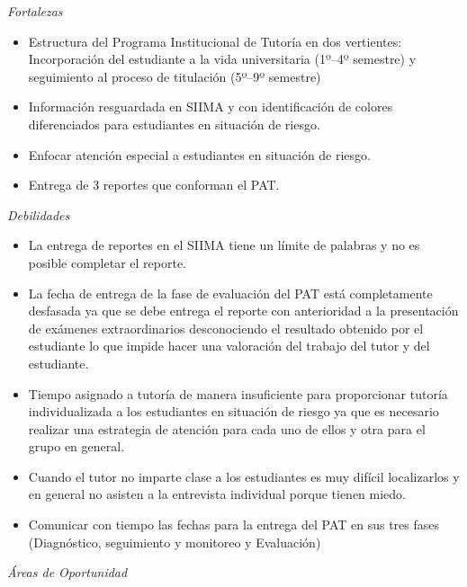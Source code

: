 \enlargethispage{1\baselineskip}
{\itshape Fortalezas}

\begin{itemize}
\item Estructura del Programa Institucional de Tutoría en dos vertientes:
Incorporación del estudiante a la vida universitaria (1º--4º semestre) y
seguimiento al proceso de titulación (5º--9º semestre)
\item Información resguardada en SIIMA y con identificación de colores
diferenciados para estudiantes en situación de riesgo.
\item Enfocar atención especial a estudiantes en situación de riesgo.
\item Entrega de 3 reportes que conforman el PAT.
\end{itemize}

{\itshape Debilidades}

\begin{itemize}
\item La entrega de reportes en el SIIMA tiene un límite de palabras y no es
posible completar el reporte.
\item La fecha de entrega de la fase de evaluación del PAT está
completamente desfasada ya que se debe entrega el reporte con anterioridad
a la presentación de exámenes extraordinarios desconociendo el resultado
obtenido por el estudiante lo que impide hacer una valoración del trabajo
del tutor y del estudiante.
\item Tiempo asignado a tutoría de manera  insuficiente para proporcionar
tutoría individualizada a los estudiantes en situación de riesgo ya que es
necesario realizar una estrategia de atención para cada uno de ellos y otra
para el grupo en general. 
\item Cuando el tutor no imparte clase a los estudiantes es muy difícil
localizarlos y en general no asisten a la entrevista individual porque
tienen miedo.
\item Comunicar con tiempo las fechas para la entrega del PAT en sus tres
fases (Diagnóstico, seguimiento y monitoreo y Evaluación)
\end{itemize}

\medskip
{\itshape Áreas de Oportunidad}

